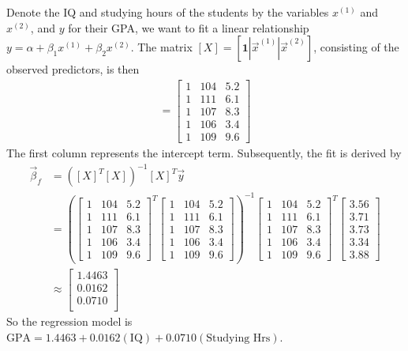 \begin{solution}
Denote the IQ and studying hours of the students by the variables $x^{(1)}$ and $x^{(2)}$, and $y$ for their GPA, we want to fit a linear relationship $y = \alpha + \beta_1 x^{(1)} + \beta_2 x^{(2)}$. The matrix $[X] = [\textbf{1}|\vec{x}^{(1)}|\vec{x}^{(2)}] $, consisting of the observed predictors, is then
\begin{align*}
[X] = \left[
\begin{array}{ccc}
1 & 104 & 5.2 \\
1 & 111 & 6.1 \\
1 & 107 & 8.3 \\
1 & 106 & 3.4 \\
1 & 109 & 9.6
\end{array}
\right]
\end{align*}
The first column represents the intercept term. Subsequently, the fit is derived by
\begin{align*}
\vec{\beta}_f &= ([X]^T [X])^{-1} [X]^T \vec{y} \\
&= \left(\left[
\begin{array}{ccc}
1 & 104 & 5.2 \\
1 & 111 & 6.1 \\
1 & 107 & 8.3 \\
1 & 106 & 3.4 \\
1 & 109 & 9.6
\end{array}
\right]^T
\left[
\begin{array}{ccc}
1 & 104 & 5.2 \\
1 & 111 & 6.1 \\
1 & 107 & 8.3 \\
1 & 106 & 3.4 \\
1 & 109 & 9.6
\end{array}
\right]\right)^{-1}
\left[
\begin{array}{ccc}
1 & 104 & 5.2 \\
1 & 111 & 6.1 \\
1 & 107 & 8.3 \\
1 & 106 & 3.4 \\
1 & 109 & 9.6
\end{array}
\right]^T
\left[
\begin{array}{c}
3.56 \\
3.71 \\
3.73 \\
3.34 \\
3.88
\end{array}
\right] \\
&\approx
\left[
\begin{array}{c}
1.4463 \\
0.0162 \\
0.0710 \\
\end{array}
\right] 
\end{align*}
So the regression model is $\text{GPA} = 1.4463 + 0.0162(\text{IQ}) + 0.0710(\text{Studying Hrs})$. 
\end{solution}

